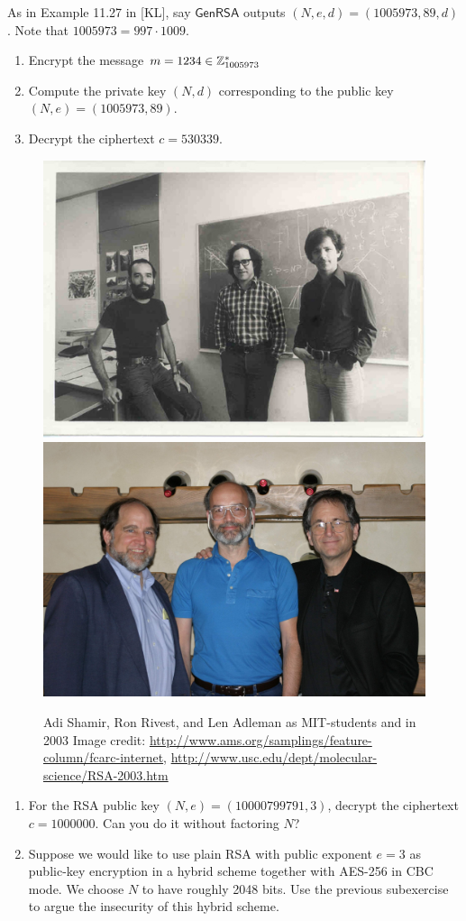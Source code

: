 \documentclass[a4paper,10pt,landscape,twocolumn]{scrartcl}
\begin{document}
\begin{exercise}[RSA]
\begin{subex}
As in Example 11.27 in [KL], say $\mathsf{GenRSA}$ outputs $(N,e,d)=(1005973,89,d)$. Note that $1005973=997 \cdot 1009$.
\begin{enumerate}
\item Encrypt the message $m=1234 \in \mathbb{Z}_{1005973}^*$
\item Compute the private key $(N,d)$ corresponding to the public key $(N,e)=(1005973,89)$.
\item Decrypt the ciphertext $c=530339$.
\end{enumerate}
\end{subex}


{
  \centering
  \begin{figure}
\includegraphics[height=0.15\textwidth]{RSA-MIT.jpg}
\includegraphics[height=0.15\textwidth]{RSA-2003.jpg}
\caption{Adi Shamir, Ron Rivest, and Len Adleman as MIT-students and in 2003\newline
{\small Image credit:
  \url{http://www.ams.org/samplings/feature-column/fcarc-internet},
  \url{http://www.usc.edu/dept/molecular-science/RSA-2003.htm}}}
\end{figure}
}

\begin{subex}
\begin{enumerate}
\item For the RSA public key $(N,e)=(10000799791, 3)$, decrypt the ciphertext $c=1 000 000$. Can you do it without factoring $N$?
\item Suppose we would like to use plain RSA with public exponent $e=3$ as public-key encryption in a hybrid scheme together with AES-256 in CBC mode. We choose $N$ to have roughly 2048 bits. Use the previous subexercise to argue the insecurity of this hybrid scheme.
\end{enumerate}
\end{subex}
\end{exercise}
\end{document}
